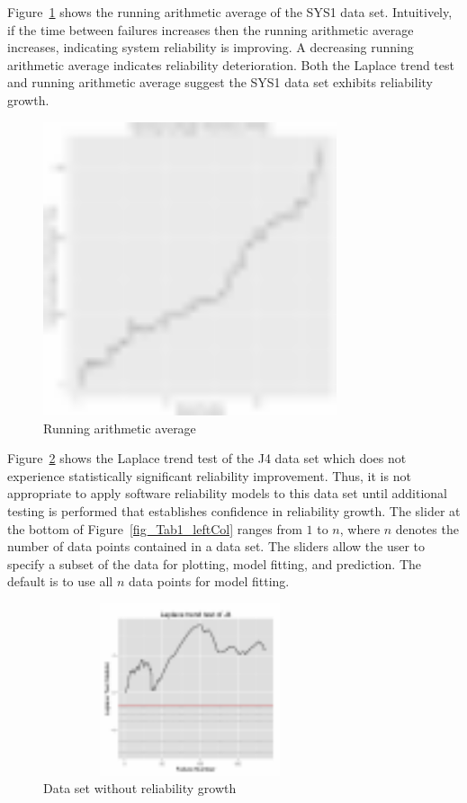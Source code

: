 \documentclass[conference]{IEEEtran}
\begin{document}
Figure~\ref{fig_SRT_RAT} shows the running arithmetic average of the SYS1 data set. Intuitively, if the time between failures increases then the running arithmetic average increases, indicating system reliability is improving. A decreasing running arithmetic average indicates reliability deterioration. Both the Laplace trend test and running arithmetic average suggest the SYS1 data set exhibits reliability growth.

\begin{figure}[!h]
\centering
\includegraphics[width=3.4in]{Figures/SRT_RAT}
\caption{Running arithmetic average}
\label{fig_SRT_RAT}
\end{figure}


Figure~\ref{fig:J4Trend} shows the Laplace trend test of the J4 data set which does not experience statistically significant reliability improvement. Thus, it is not appropriate to apply software reliability models to this data set until additional testing is performed that establishes confidence in reliability growth. The slider at the bottom of Figure~\ref{fig_Tab1_leftCol} ranges from $1$ to $n$, where $n$ denotes the number of data points contained in a data set. The sliders allow the user to specify a subset of the data for plotting, model fitting, and prediction. The default is to use all $n$ data points for model fitting.

\begin{figure}[!h]
\centering
\includegraphics[width=3.4in,height=2in]{Figures/J4_Trend_LP}
\caption{Data set without reliability growth}
\label{fig:J4Trend}
\end{figure}
\end{document}
